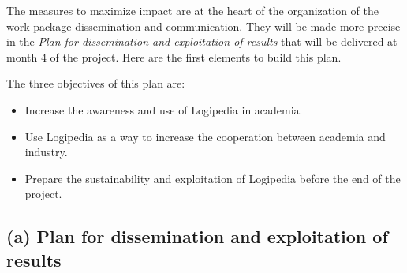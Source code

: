 The measures to maximize impact are at the heart of the organization
of the work package dissemination and communication. They will be made
more precise in the {\em Plan for dissemination and exploitation of
results} that will be delivered at month 4 of the project.
Here are the first elements to build this plan.

The three objectives of this plan are:
\begin{itemize}
\item Increase the awareness and use of Logipedia in academia.
\item Use Logipedia as a way to increase the cooperation between academia and
industry. 
\item Prepare the sustainability and exploitation of Logipedia before the
  end of the project.
\end{itemize}




\subsection*{(a) Plan for dissemination and exploitation of results}
\label{sec:dissemination}


